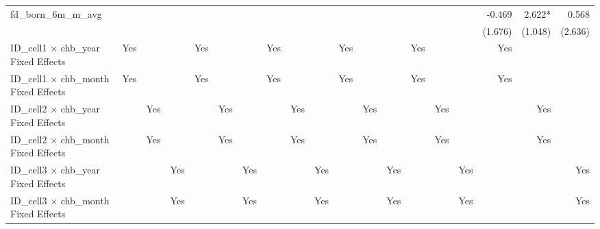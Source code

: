 \begin{tabular}{lrrrrrrrrrrrrrrrrrr}
fd\_born\_6m\_m\_avg                        &             &             &             &             &             &             &             &             &             &             &             &             &             &             &             &      -0.469 &      2.622* &       0.568 \\ 
                                            &             &             &             &             &             &             &             &             &             &             &             &             &             &             &             &     (1.676) &     (1.048) &     (2.636) \\ 
\midrule
ID\_cell1 $\times$ chb\_year Fixed Effects  &         Yes &             &             &         Yes &             &             &         Yes &             &             &         Yes &             &             &         Yes &             &             &         Yes &             &             \\ 
ID\_cell1 $\times$ chb\_month Fixed Effects &         Yes &             &             &         Yes &             &             &         Yes &             &             &         Yes &             &             &         Yes &             &             &         Yes &             &             \\ 
ID\_cell2 $\times$ chb\_year Fixed Effects  &             &         Yes &             &             &         Yes &             &             &         Yes &             &             &         Yes &             &             &         Yes &             &             &         Yes &             \\ 
ID\_cell2 $\times$ chb\_month Fixed Effects &             &         Yes &             &             &         Yes &             &             &         Yes &             &             &         Yes &             &             &         Yes &             &             &         Yes &             \\ 
ID\_cell3 $\times$ chb\_year Fixed Effects  &             &             &         Yes &             &             &         Yes &             &             &         Yes &             &             &         Yes &             &             &         Yes &             &             &         Yes \\ 
ID\_cell3 $\times$ chb\_month Fixed Effects &             &             &         Yes &             &             &         Yes &             &             &         Yes &             &             &         Yes &             &             &         Yes &             &             &         Yes \\ 

\end{tabular}
